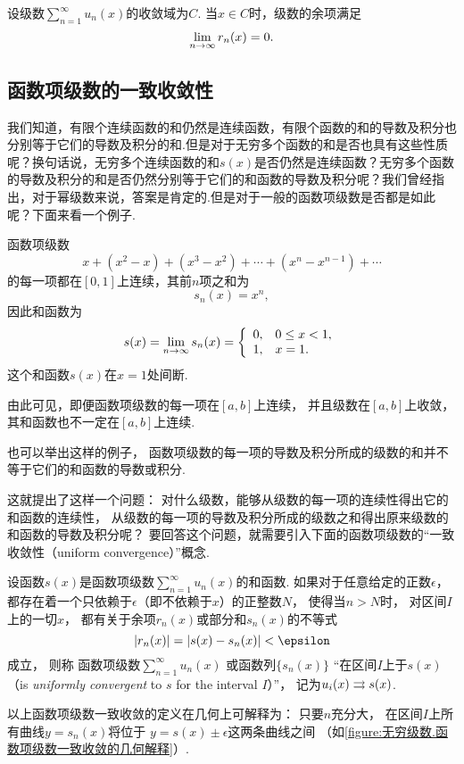 \begin{property}
设级数\(\sum\limits_{n=1}^\infty u_n(x)\)的收敛域为\(C\).
当\(x \in C\)时，级数的余项满足\[
\lim\limits_{n\to\infty} r_n(x) = 0.
\]
\end{property}

\subsection{函数项级数的一致收敛性}
我们知道，有限个连续函数的和仍然是连续函数，有限个函数的和的导数及积分也分别等于它们的导数及积分的和.但是对于无穷多个函数的和是否也具有这些性质呢？换句话说，无穷多个连续函数的和\(s(x)\)是否仍然是连续函数？无穷多个函数的导数及积分的和是否仍然分别等于它们的和函数的导数及积分呢？我们曾经指出，对于幂级数来说，答案是肯定的.但是对于一般的函数项级数是否都是如此呢？下面来看一个例子.
\begin{example}
函数项级数\[
x + (x^2-x) + (x^3-x^2) + \dotsb + (x^n-x^{n-1}) + \dotsb
\]的每一项都在\([0,1]\)上连续，其前\(n\)项之和为\[
s_n(x) = x^n,
\]因此和函数为\[
s(x) = \lim\limits_{n\to\infty} s_n(x)
= \left\{ \begin{array}{ll}
0, & 0 \leq x < 1, \\
1, & x = 1.
\end{array} \right.
\]
这个和函数\(s(x)\)在\(x=1\)处间断.
\end{example}

由此可见，即便函数项级数的每一项在\([a,b]\)上连续，
并且级数在\([a,b]\)上收敛，
其和函数也不一定在\([a,b]\)上连续.

也可以举出这样的例子，
函数项级数的每一项的导数及积分所成的级数的和并不等于它们的和函数的导数或积分.

这就提出了这样一个问题：
对什么级数，能够从级数的每一项的连续性得出它的和函数的连续性，
从级数的每一项的导数及积分所成的级数之和得出原来级数的和函数的导数及积分呢？
要回答这个问题，就需要引入下面的函数项级数的“一致收敛性（uniform convergence）”概念.

\begin{definition}\label{definition:无穷级数.函数项级数的一致收敛性}
设函数\(s(x)\)是函数项级数\(\sum\limits_{n=1}^\infty u_n(x)\)的和函数.
如果对于任意给定的正数\(\epsilon\)，
都存在着一个只依赖于\(\epsilon\)（即不依赖于\(x\)）的正整数\(N\)，
使得当\(n>N\)时，
对区间\(I\)上的一切\(x\)，
都有关于余项\(r_n(x)\)或部分和\(s_n(x)\)的不等式\[
\abs{r_n(x)} = \abs{s(x) - s_n(x)} < \epsilon
\]成立，
则称
函数项级数\(\sum\limits_{n=1}^\infty u_n(x)\)
或函数列\(\{s_n(x)\}\)
“在区间\(I\)上于\(s(x)\)%
（is \emph{uniformly convergent} to \(s\) for the interval \(I\)）”，
记为\(u_i(x) \rightrightarrows s(x)\).
\end{definition}
以上函数项级数一致收敛的定义在几何上可解释为：
只要\(n\)充分大，
在区间\(I\)上所有曲线\(y = s_n(x)\)将位于%
\(y = s(x) \pm \epsilon\)这两条曲线之间%
（如\cref{figure:无穷级数.函数项级数一致收敛的几何解释}）.


